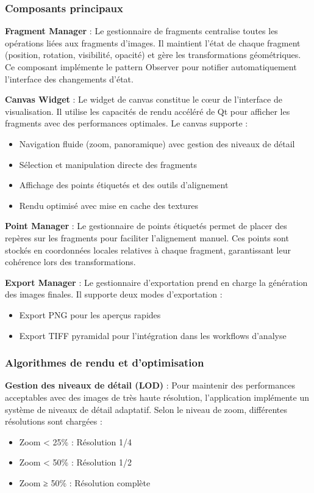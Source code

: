 \documentclass[12pt,a4paper]{report}
\begin{document}
\subsubsection{Composants principaux}

\textbf{Fragment Manager} : Le gestionnaire de fragments centralise toutes les opérations liées aux fragments d'images. Il maintient l'état de chaque fragment (position, rotation, visibilité, opacité) et gère les transformations géométriques. Ce composant implémente le pattern Observer pour notifier automatiquement l'interface des changements d'état.

\textbf{Canvas Widget} : Le widget de canvas constitue le cœur de l'interface de visualisation. Il utilise les capacités de rendu accéléré de Qt pour afficher les fragments avec des performances optimales. Le canvas supporte :
\begin{itemize}
\item Navigation fluide (zoom, panoramique) avec gestion des niveaux de détail
\item Sélection et manipulation directe des fragments
\item Affichage des points étiquetés et des outils d'alignement
\item Rendu optimisé avec mise en cache des textures
\end{itemize}

\textbf{Point Manager} : Le gestionnaire de points étiquetés permet de placer des repères sur les fragments pour faciliter l'alignement manuel. Ces points sont stockés en coordonnées locales relatives à chaque fragment, garantissant leur cohérence lors des transformations.

\textbf{Export Manager} : Le gestionnaire d'exportation prend en charge la génération des images finales. Il supporte deux modes d'exportation :
\begin{itemize}
\item Export PNG pour les aperçus rapides
\item Export TIFF pyramidal pour l'intégration dans les workflows d'analyse
\end{itemize}

\subsubsection{Algorithmes de rendu et d'optimisation}

\textbf{Gestion des niveaux de détail (LOD)} : Pour maintenir des performances acceptables avec des images de très haute résolution, l'application implémente un système de niveaux de détail adaptatif. Selon le niveau de zoom, différentes résolutions sont chargées :
\begin{itemize}
\item Zoom < 25\% : Résolution 1/4
\item Zoom < 50\% : Résolution 1/2  
\item Zoom ≥ 50\% : Résolution complète
\end{itemize}
\end{document}
